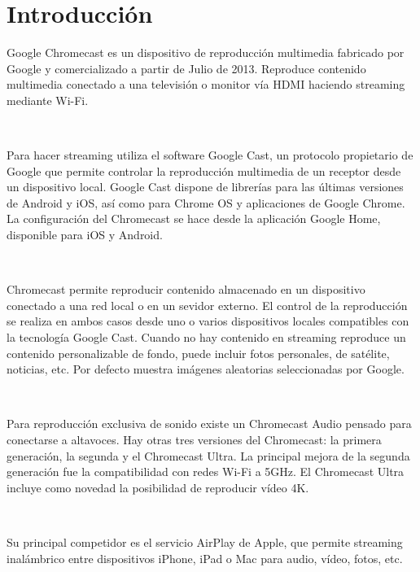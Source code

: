 \section{Introducción}
Google Chromecast es un dispositivo de reproducción multimedia fabricado por Google y comercializado a partir de Julio de 2013. Reproduce contenido multimedia conectado a una televisión o monitor vía HDMI haciendo streaming mediante Wi-Fi.

\

Para hacer streaming utiliza el software Google Cast, un protocolo propietario de Google que permite controlar la reproducción multimedia de un receptor desde un dispositivo local. Google Cast dispone de librerías para las últimas versiones de Android y iOS, así como para Chrome OS y aplicaciones de Google Chrome. La configuración del Chromecast se hace desde la aplicación Google Home, disponible para iOS y Android.

\

Chromecast permite reproducir contenido almacenado en un dispositivo conectado a una red local o en un sevidor externo. El control de la reproducción se realiza en ambos casos desde uno o varios dispositivos locales compatibles con la tecnología Google Cast. Cuando no hay contenido en streaming reproduce un contenido personalizable de fondo, puede incluir fotos personales,
de satélite, noticias, etc. Por defecto muestra imágenes aleatorias seleccionadas por Google.

\

Para reproducción exclusiva de sonido existe un Chromecast Audio pensado para conectarse a altavoces. Hay otras tres versiones del Chromecast: la primera generación, la segunda y el Chromecast Ultra. La principal mejora de la segunda generación fue la compatibilidad con redes Wi-Fi a 5GHz. El Chromecast Ultra incluye como novedad la posibilidad de reproducir vídeo 4K.

\

Su principal competidor es el servicio AirPlay de Apple, que permite streaming inalámbrico entre dispositivos iPhone, iPad o Mac para audio, vídeo, fotos, etc.
